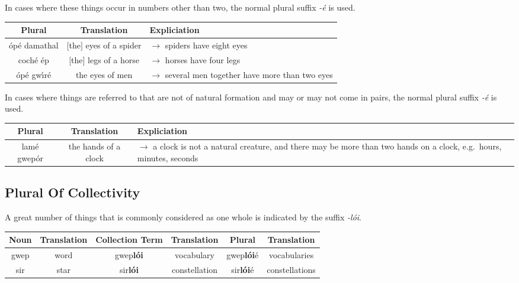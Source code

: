 In cases where these things occur in numbers other than two, the normal plural suffix \textit{-\'{e}} is used.
\begin{table}[H]
\centering
\begin{tabu}{c|c|p{10.0cm}}
  \textbf{Plural} & \textbf{Translation} & \textbf{Expliciation}\\
  \toprule
  \'{o}p\'{e} damathal & $[$the$]$ eyes of a spider & $\rightarrow$ spiders have eight eyes\\
  coch\'{e} \'{e}p & $[$the$]$ legs of a horse & $\rightarrow$ horses have four legs\\
  \'{o}p\'{e} gw\'{\i}r\'{e} & the eyes of men & $\rightarrow$ several men together have more than two eyes
\end{tabu}
\label{example_plural_more_than_two}
\end{table}

In cases where things are referred to that are not of natural formation and may or may not come in pairs, the normal plural suffix \textit{-\'{e}} is used.
\begin{table}[H]
\centering
\begin{tabu}{c|c|p{10.0cm}}
  \textbf{Plural} & \textbf{Translation} & \textbf{Expliciation}\\
  \toprule
  lam\'{e} gwep\'{o}r & the hands of a clock & $\rightarrow$ a clock is not a natural creature, and there may be more than two hands on a clock, e.g.\ hours, minutes, seconds\\
\end{tabu}
\label{example_plural_may_or_not}
\end{table}

\subsection{Plural Of Collectivity}

A great number of things that is commonly considered as one whole is indicated by the suffix \textit{-l\'{o}i}.
\begin{table}[H]
\centering
\begin{tabu}{c|c|c|c|c|c}
  \textbf{Noun} & \textbf{Translation} & \textbf{Collection Term} & \textbf{Translation} & \textbf{Plural} & \textbf{Translation}\\
  \toprule
  gwep & word & gwep\textbf{l\'{o}i} & vocabulary & gwep\textbf{l\'{o}i}\'{e} & vocabularies\\
  sir & star & sir\textbf{l\'{o}i} & constellation & sir\textbf{l\'{o}i}\'{e} & constellations
\end{tabu}
\label{example_plural_one_whole}
\end{table}

